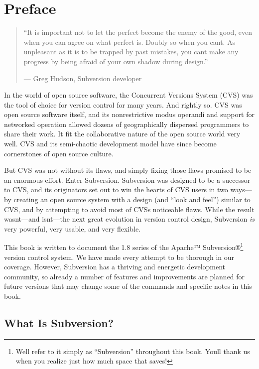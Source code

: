 \chapter{Preface}\label{svn.preface}

\begin{quote}
``It is important not to let the perfect become the enemy of the good,
even when you can agree on what perfect is. Doubly so when you
can\textquotesingle t. As unpleasant as it is to be trapped by past
mistakes, you can\textquotesingle t make any progress by being afraid of
your own shadow during design.''

--- Greg Hudson, Subversion developer
\end{quote}

In the world of open source software, the Concurrent Versions System
(CVS) was the tool of choice for version control for many years. And
rightly so. CVS was open source software itself, and its nonrestrictive
modus operandi and support for networked operation allowed dozens of
geographically dispersed programmers to share their work. It fit the
collaborative nature of the open source world very well. CVS and its
semi-chaotic development model have since become cornerstones of open
source culture.

But CVS was not without its flaws, and simply fixing those flaws
promised to be an enormous effort. Enter Subversion. Subversion was
designed to be a successor to CVS, and its originators set out to win
the hearts of CVS users in two ways---by creating an open source system
with a design (and ``look and feel'') similar to CVS, and by attempting
to avoid most of CVS\textquotesingle s noticeable flaws. While the
result wasn\textquotesingle t---and isn\textquotesingle t---the next
great evolution in version control design, Subversion \emph{is} very
powerful, very usable, and very flexible.

This book is written to document the 1.8 series of the Apache™
Subversion®\footnote{We\textquotesingle ll refer to it simply as
  ``Subversion'' throughout this book. You\textquotesingle ll thank us
  when you realize just how much space that saves!} version control
system. We have made every attempt to be thorough in our coverage.
However, Subversion has a thriving and energetic development community,
so already a number of features and improvements are planned for future
versions that may change some of the commands and specific notes in this
book.

\section{What Is Subversion?}\label{svn.intro.whatis}

